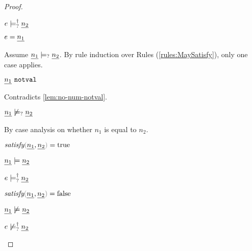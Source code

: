 \begin{proof}
\begin{byCases}
\begin{byCases}
\begin{pfsteps*}
        \item $e \models_{?}^{\dag} \underline{n_2}$  
        \end{pfsteps*}
    \item[\text{(\ref{rule:TNum})}]
        \begin{pfsteps*}
        \item $e=\underline{n_1}$ 
        \end{pfsteps*}
        Assume $\underline{n_1} \models_{?} \underline{n_2}$. By rule induction over Rules (\ref{rules:MaySatisfy}), only one case applies.
        \begin{byCases}
        \item[\text{(\ref{rule:CMSNotVal})}]
            \begin{pfsteps*}
            \item $\underline{n_1} ~\mathtt{notval}$ 
            \end{pfsteps*}
            Contradicts \autoref{lem:no-num-notval}.
        \end{byCases}
        \begin{pfsteps*}
        \item $\underline{n_1} \not\models_{?} \underline{n_2}$  
        \end{pfsteps*}
        By case analysis on whether $n_1$ is equal to $n_2$.
        \begin{byCases}
        \item[n_1=n_2]
            \begin{pfsteps*}
            \item $\fsatisfy{\hnum{n_1}}{\cnum{n_2}}=\true$  
            \item $\underline{n_1} \models \underline{n_2}$  
            \item $e \models_{?}^{\dag} \underline{n_2}$  
            \end{pfsteps*}
        \item[n_1\neq n_2]
            \begin{pfsteps*}
            \item $\fsatisfy{\hnum{n_1}}{\cnum{n_2}}=\false$  
            \item $\underline{n_1} \not\models \underline{n_2}$  
            \item $e \not\models_{?}^{\dag} \underline{n_2}$  
            \end{pfsteps*}
        \end{byCases}
    \end{byCases}


\end{byCases}
\end{proof}
